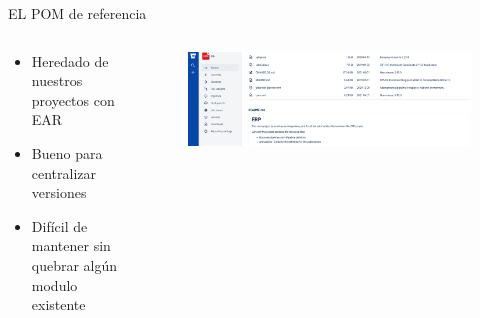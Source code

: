 \documentclass[aspectratio=169]{beamer}
\begin{document}
\begin{frame}{EL POM de referencia}


\begin{columns}[T] %
\begin{column}[T]{4cm} %
        \begin{itemize}
            \item Heredado de nuestros proyectos con EAR
            \item Bueno para centralizar versiones
           \item Difícil de mantener sin quebrar algún modulo existente
        \end{itemize}
\end{column}
\begin{column}[T]{10cm} %

\begin{figure}
        \centering
        \includegraphics[width=\linewidth]{Images/thepom.png}
        \label{fig:pom}
    \end{figure}
\end{column}
\end{columns}

\end{frame}
\end{document}
